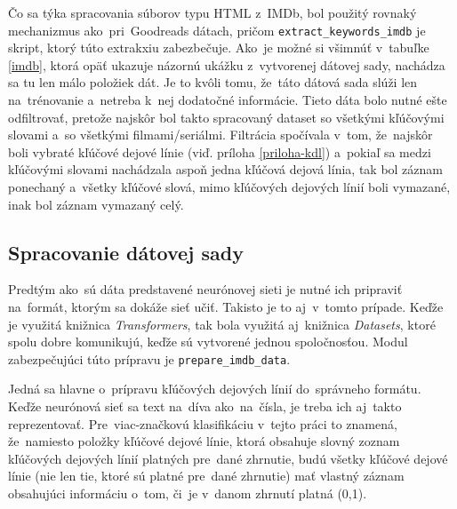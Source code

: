 Čo sa týka spracovania súborov typu HTML z~IMDb, bol použitý rovnaký mechanizmus ako~pri~Goodreads dátach, pričom {\tt extract\_keywords\_imdb} je skript, ktorý túto extrakxiu zabezbečuje. Ako~je možné si všimnúť v~tabuľke \ref{imdb}, ktorá opäť ukazuje názornú ukážku z~vytvorenej dátovej sady, nachádza sa tu len málo položiek dát. Je to kvôli tomu, že~táto dátová sada slúži len na~trénovanie a~netreba k~nej dodatočné informácie. Tieto dáta bolo nutné ešte odfiltrovať, pretože najskôr bol takto spracovaný dataset so všetkými kľúčovými slovami a~so všetkými filmami/seriálmi. Filtrácia spočívala v~tom, že~najskôr boli vybraté kľúčové dejové línie (viď. príloha \ref{priloha-kdl}) a~pokiaľ sa medzi kľúčovými slovami nachádzala aspoň jedna kľúčová dejová línia, tak bol záznam ponechaný a~všetky kľúčové slová, mimo kľúčových dejových línií boli vymazané, inak bol záznam vymazaný celý.   

\subsection*{Spracovanie dátovej sady}

Predtým ako~sú dáta predstavené neurónovej sieti je nutné ich pripraviť na~formát, ktorým sa dokáže sieť učiť. Takisto je to aj~v~tomto prípade. Keďže je využitá knižnica \textit{Transformers}, tak bola využitá aj~knižnica \textit{Datasets}, ktoré spolu dobre komunikujú, keďže sú vytvorené jednou spoločnosťou. Modul zabezpečujúci túto prípravu je {\tt prepare\_imdb\_data}. 

Jedná sa hlavne o~prípravu kľúčových dejových línií do~správneho formátu. Keďže neurónová sieť sa text na~díva ako~na~čísla, je treba ich aj~takto reprezentovať. Pre~viac-značkovú klasifikáciu v~tejto práci to znamená, že~namiesto položky kľúčové dejové línie, ktorá obsahuje slovný zoznam kľúčových dejových línií platných pre~dané zhrnutie, budú všetky kľúčové dejové línie (nie len tie, ktoré sú platné pre~dané zhrnutie) mať vlastný záznam obsahujúci informáciu o~tom, či~je v~danom zhrnutí platná (0,1). 

